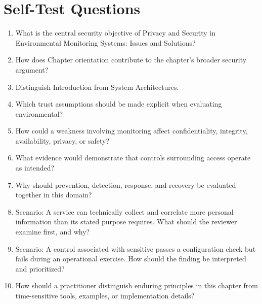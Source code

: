 \documentclass[11pt,letterpaper]{article}
\begin{document}
\section*{Self-Test Questions}
\begin{enumerate}
\item What is the central security objective of Privacy and Security in Environmental Monitoring Systems: Issues and Solutions?
\item How does Chapter orientation contribute to the chapter's broader security argument?
\item Distinguish Introduction from System Architectures.
\item Which trust assumptions should be made explicit when evaluating environmental?
\item How could a weakness involving monitoring affect confidentiality, integrity, availability, privacy, or safety?
\item What evidence would demonstrate that controls surrounding access operate as intended?
\item Why should prevention, detection, response, and recovery be evaluated together in this domain?
\item Scenario: A service can technically collect and correlate more personal information than its stated purpose requires. What should the reviewer examine first, and why?
\item Scenario: A control associated with sensitive passes a configuration check but fails during an operational exercise. How should the finding be interpreted and prioritized?
\item How should a practitioner distinguish enduring principles in this chapter from time-sensitive tools, examples, or implementation details?
\end{enumerate}
\end{document}
